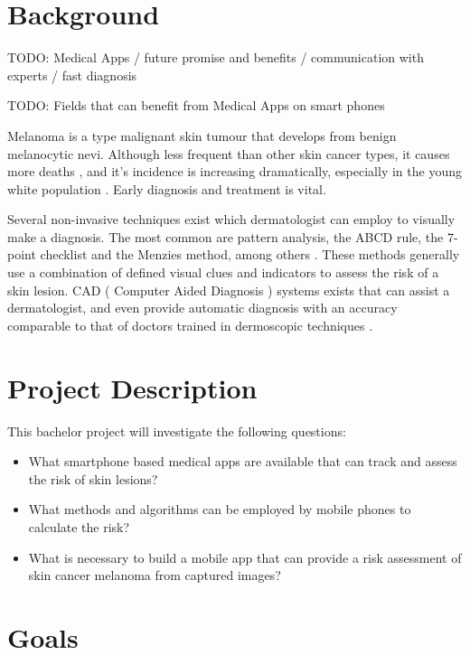 \section{Background}

TODO: Medical Apps / future promise and benefits / communication with experts / fast diagnosis

TODO: Fields that can benefit from Medical Apps on smart phones


Melanoma is a type malignant skin tumour that develops from benign melanocytic nevi. Although less frequent than other skin cancer types, it causes more deaths \cite{cancer_gov_skin}, and it’s incidence is increasing dramatically, especially in the young white population \cite{S_ez_2013}. Early diagnosis and treatment is vital.

Several non-invasive techniques exist which dermatologist can employ to visually make a diagnosis. The most common are pattern analysis, the ABCD rule, the 7-point checklist and the Menzies method, among others \cite{marghoob2004atlas}. These methods generally use a combination of defined visual clues and indicators to assess the risk of a skin lesion. CAD ( Computer Aided Diagnosis ) systems exists that can assist a dermatologist, and even provide automatic diagnosis with an accuracy comparable to that of doctors trained in dermoscopic techniques \cite{Filho2015}.


\section{Project Description}

This bachelor project will investigate the following questions:

\noindent
\begin{itemize}
\item What smartphone based medical apps are available that can track and assess the risk of skin lesions?
\item What methods and algorithms can be employed by mobile phones to calculate the risk?
\item What is necessary to build a mobile app that can provide a risk assessment of skin cancer melanoma from captured images?

\end{itemize}

\section{Goals}

